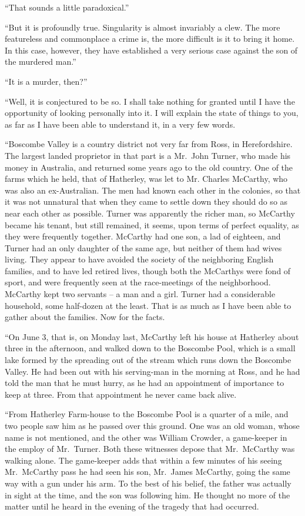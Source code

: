 “That sounds a little paradoxical.”

“But it is profoundly true. Singularity is almost invariably
a clew. The more featureless and commonplace a crime is,
the more difficult is it to bring it home. In this case, however,
they have established a very serious case against the son
of the murdered man.”

“It is a murder, then?”

“Well, it is conjectured to be so. I shall take nothing for
granted until I have the opportunity of looking personally
into it. I will explain the state of things to you, as far as I
have been able to understand it, in a very few words.

“Boscombe Valley is a country district not very far from
Ross, in Herefordshire. The largest landed proprietor in
that part is a Mr.~John Turner, who made his money in Australia,
and returned some years ago to the old country. One
of the farms which he held, that of Hatherley, was let to Mr.
Charles McCarthy, who was also an ex-Australian. The men
had known each other in the colonies, so that it was not
unnatural that when they came to settle down they should do so
as near each other as possible. Turner was apparently the
richer man, so McCarthy became his tenant, but still remained,
it seems, upon terms of perfect equality, as they were
frequently together. McCarthy had one son, a lad of eighteen,
and Turner had an only daughter of the same age, but
neither of them had wives living. They appear to have avoided
the society of the neighboring English families, and to have
led retired lives, though both the McCarthys were fond of
sport, and were frequently seen at the race-meetings of the
neighborhood. McCarthy kept two servants -- a man and a
girl. Turner had a considerable household, some half-dozen
at the least. That is as much as I have been able to gather
about the families. Now for the facts.

“On June 3, that is, on Monday last, McCarthy left his
house at Hatherley about three in the afternoon, and walked
down to the Boscombe Pool, which is a small lake formed by
the spreading out of the stream which runs down the Boscombe
Valley. He had been out with his serving-man in the
morning at Ross, and he had told the man that he must hurry,
as he had an appointment of importance to keep at three.
From that appointment he never came back alive.

“From Hatherley Farm-house to the Boscombe Pool is a
quarter of a mile, and two people saw him as he passed over
this ground. One was an old woman, whose name is not
mentioned, and the other was William Crowder, a game-keeper
in the employ of Mr.~Turner. Both these witnesses depose
that Mr.~McCarthy was walking alone. The game-keeper adds
that within a few minutes of his seeing Mr.~McCarthy pass he
had seen his son, Mr.~James McCarthy, going the same way
with a gun under his arm. To the best of his belief, the father
was actually in sight at the time, and the son was following
him. He thought no more of the matter until he heard
in the evening of the tragedy that had occurred.

